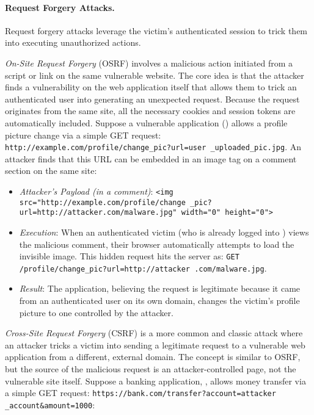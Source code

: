 \paragraph{Request Forgery Attacks.} Request forgery attacks leverage the victim's authenticated session to trick them into executing unauthorized actions.

\emph{On-Site Request Forgery} (OSRF) involves a malicious action initiated from a script or link on the same vulnerable website. The core idea is that the attacker finds a vulnerability on the web application itself that allows them to trick an authenticated user into generating an unexpected request. Because the request originates from the same site, all the necessary cookies and session tokens are automatically included. Suppose a vulnerable application () allows a profile picture change via a simple GET request: \texttt{http://example.com/profile/change\_pic?url=user \_uploaded\_pic.jpg}. An attacker finds that this URL can be embedded in an image tag on a comment section on the same site:

\begin{itemize}
    \item \textit{Attacker's Payload (in a comment)}: \texttt{<img src="http://example.com/profile/change \_pic?url=http://attacker.com/malware.jpg" width="0" height="0">}
    \item \textit{Execution}: When an authenticated victim (who is already logged into ) views the malicious comment, their browser automatically attempts to load the invisible image. This hidden request hits the server as: \texttt{GET /profile/change\_pic?url=http://attacker .com/malware.jpg}.
    \item \textit{Result}: The application, believing the request is legitimate because it came from an authenticated user on its own domain, changes the victim's profile picture to one controlled by the attacker.
\end{itemize}

\emph{Cross-Site Request Forgery} (CSRF) is a more common and classic attack where an attacker tricks a victim into sending a legitimate request to a vulnerable web application from a different, external domain. The concept is similar to OSRF, but the source of the malicious request is an attacker-controlled page, not the vulnerable site itself. Suppose a banking application, , allows money transfer via a simple GET request: \texttt{https://bank.com/transfer?account=attacker \_account\&amount=1000}:

